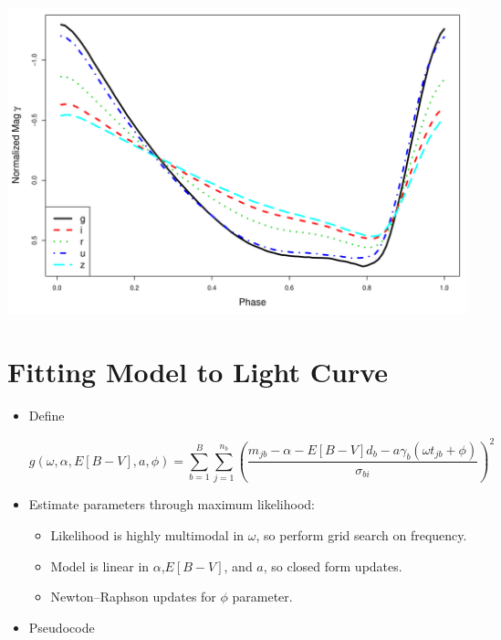 \documentclass[a0,portrait]{a0poster}
\begin{document}
\begin{multicols}{2}
\begin{itemize}
\begin{center}\vspace{1cm}
\includegraphics[width=0.7\linewidth]{templates.pdf}
\end{center}\vspace{1cm}


\end{itemize}


\section*{Fitting Model to Light Curve}

\begin{itemize}

\item Define

\begin{equation*}
g(\omega,\alpha,E[B-V],a,\phi) = \sum_{b=1}^B \sum_{j=1}^{n_b}\left(\frac{m_{jb} - \alpha - E[B-V]d_b - a\gamma_b(\omega t_{jb} + \phi)}{\sigma_{bi}}\right)^2
\end{equation*}

\item Estimate parameters through maximum likelihood:
\begin{itemize}
\item Likelihood is highly multimodal in $\omega$, so perform grid search on frequency.
\item Model is linear in $\alpha$,$E[B-V]$, and $a$, so closed form updates.
\item Newton--Raphson updates for $\phi$ parameter.
\end{itemize}

\item Pseudocode


\end{itemize}
\end{multicols}
\end{document}

